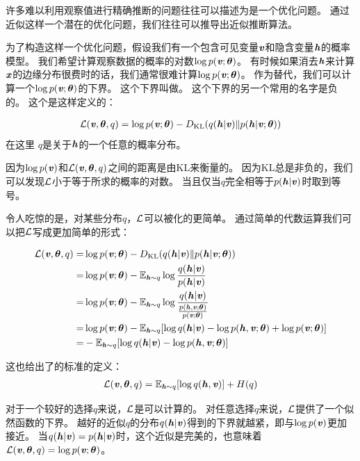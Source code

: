 许多难以利用观察值进行精确推断的问题往往可以描述为是一个优化问题。
通过近似这样一个潜在的优化问题，我们往往可以推导出近似推断算法。


为了构造这样一个优化问题，假设我们有一个包含可见变量$\Vv$和隐含变量$\Vh$的概率模型。
我们希望计算观察数据的概率的对数$\log p(\Vv;\Vtheta)$。
有时候如果消去$\Vh$来计算$\Vx$的边缘分布很费时的话，我们通常很难计算$\log p(\Vv;\Vtheta)$。
作为替代，我们可以计算一个$\log p(\Vv;\Vtheta)$的下界。
这个下界叫做。
这个下界的另一个常用的名字是负的。
这个是这样定义的：

\begin{align}
\CalL(\Vv,{\Vtheta},q) = \log p(\Vv;{\Vtheta}) - D_{\text{KL}}(q(\Vh\vert\Vv) \Vert p(\Vh\vert\Vv;{\Vtheta}))
\end{align}
在这里 $q$是关于$\Vh$的一个任意的概率分布。


因为$\log p(\Vv)$和$\CalL(\Vv,{\Vtheta},q)$之间的距离是由\gls{KL}来衡量的。
因为\gls{KL}总是非负的，我们可以发现$\CalL$小于等于所求的概率的对数。
当且仅当$q$完全相等于$p(\Vh\vert\Vv)$时取到等号。


令人吃惊的是，对某些分布$q$，$\CalL$可以被化的更简单。
通过简单的代数运算我们可以把$\CalL$写成更加简单的形式：

\begin{align}
\CalL(\Vv,{\Vtheta},q) = & \log p(\Vv;{\Vtheta})- D_{\text{KL}}(q(\Vh\vert\Vv)\Vert p(\Vh\vert\Vv;{\Vtheta})) \\
= & \log p(\Vv;{\Vtheta}) - \SetE_{\Vh\sim q}\log \frac{q(\Vh\vert\Vv)}{p(\Vh\vert\Vv)} \\
= & \log p(\Vv;{\Vtheta}) -  \SetE_{\Vh\sim q} \log \frac{q(\Vh\vert\Vv) }{ \frac{p(\Vh,\Vv;{\Vtheta})}{p(\Vv; {\Vtheta})} } \\
= & \log p(\Vv; {\Vtheta}) -  \SetE_{\Vh\sim q} [\log q(\Vh\vert\Vv) - \log {p(\Vh,\Vv; {\Vtheta})} + \log {p(\Vv; {\Vtheta})} ]\\
= & - \SetE_{\Vh\sim q}[\log q(\Vh\vert\Vv) - \log {p(\Vh,\Vv;{\Vtheta})}]
\end{align}


这也给出了的标准的定义：
\begin{align}
\CalL(\Vv,{\Vtheta},q) = \SetE_{\Vh\sim q}[\log q(\Vh , \Vv)] + H(q)
\end{align}


对于一个较好的选择$q$来说，$\CalL$是可以计算的。
对任意选择$q$来说，$\CalL$提供了一个似然函数的下界。
越好的近似$q$的分布$q(\Vh\vert\Vv)$得到的下界就越紧，即与$\log p(\Vv)$更加接近。
当$q(\Vh\vert\Vv) = p(\Vh\vert\Vv)$时，这个近似是完美的，也意味着$\CalL(\Vv,{\Vtheta},q) = \log {p(\Vv;{\Vtheta})} $。


